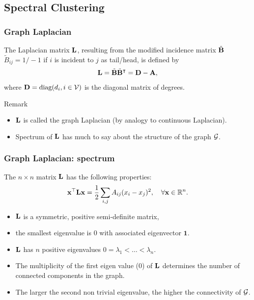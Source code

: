 \documentclass{beamer}\usepackage[]{graphicx}\usepackage[]{color}
\begin{document}
\subsection{Spectral Clustering}

\begin{frame}
  \frametitle{Graph Laplacian}

  \begin{definition}
    The Laplacian matrix $\bL$, resulting from the modified incidence matrix $\tilde{\mathbf{B}}$ $\tilde{\! B}_{ij}= 1/-1$ if $i$ is incident to $j$ as tail/head, is defined by 
    \[
      \mathbf{L} = \tilde {\mathbf{B}} \tilde {\mathbf{B}}^\intercal = \mathbf{D} - \mathbf{A},
    \]
    where $\mathbf{D} = \text{diag}(d_i, i\in\mathcal{V})$ is the diagonal matrix of degrees. 
  \end{definition}

  \begin{block}{Remark}
    \begin{itemize}
    \item $\bL$ is called the graph Laplacian (by analogy to continuous Laplacian).
    \item Spectrum of $\bL$ has much to say about the structure of the graph $\mathcal{G}$.
    \end{itemize}
  \end{block}

\end{frame}

\begin{frame}
  \frametitle{Graph Laplacian: spectrum}

  \begin{proposition}[Spectrum of $\bL$]
    The $n\times n$ matrix $\bL$ has the following properties:
    \[
      \mathbf{x}^\top \mathbf{L} \mathbf{x} = \frac{1}{2} \sum_{i,j} A_{ij} (x_i - x_j)^2, \quad \forall \mathbf{x}\in\mathbb{R}^n .
    \]
    \vspace{-.25cm}
    \begin{itemize}
      \item $\bL$ is a symmetric, positive semi-definite matrix,
      \item  the smallest eigenvalue is $0$ with associated eigenvector $\mathbf{1}$.
      \item $\bL$ has $n$ positive eigenvalues $0=\lambda_1<\dots <\lambda_n$. 
    \end{itemize}  
  \end{proposition}

  \begin{corollary}
    \vspace{-.25cm}
    \begin{itemize}
      \item The multiplicity of the first eigen value ($0$) of $\bL$ determines the number of connected components in the graph.
      \item The larger the second non trivial eigenvalue, the higher the connectivity of $\mathcal{G}$.
    \end{itemize}  
  \end{corollary}

\end{frame}
\end{document}
